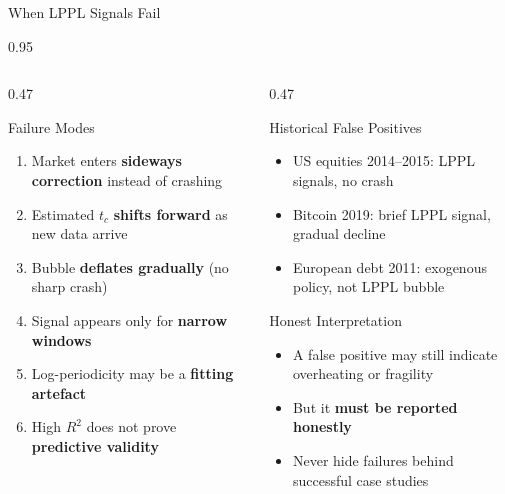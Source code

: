 \documentclass[9pt, aspectratio=169, t]{beamer}
\begin{document}
\begin{frame}{When LPPL Signals Fail}
    \begin{cminipage}{0.95\textwidth}
    {\scriptsize
    \begin{columns}[T]
        \begin{column}{0.47\textwidth}
            \begin{alertblock}{Failure Modes}
                \begin{enumerate}\setlength{\itemsep}{0pt}
                    \item Market enters \textbf{sideways correction} instead of crashing
                    \item Estimated $t_c$ \textbf{shifts forward} as new data arrive
                    \item Bubble \textbf{deflates gradually} (no sharp crash)
                    \item Signal appears only for \textbf{narrow windows}
                    \item Log-periodicity may be a \textbf{fitting artefact}
                    \item High $R^2$ does not prove \textbf{predictive validity}
                \end{enumerate}
            \end{alertblock}
        \end{column}
        \begin{column}{0.47\textwidth}
            \begin{alertblock}{Historical False Positives}
                \begin{itemize}\setlength{\itemsep}{0pt}
                    \item US equities 2014--2015: LPPL signals, no crash
                    \item Bitcoin 2019: brief LPPL signal, gradual decline
                    \item European debt 2011: exogenous policy, not LPPL bubble
                \end{itemize}
            \end{alertblock}

            \begin{block}{Honest Interpretation}
                \begin{itemize}\setlength{\itemsep}{0pt}
                    \item A false positive may still indicate overheating or fragility
                    \item But it \textbf{must be reported honestly}
                    \item Never hide failures behind successful case studies
                \end{itemize}
            \end{block}
        \end{column}
    \end{columns}
    }
    \end{cminipage}
\end{frame}
\end{document}
